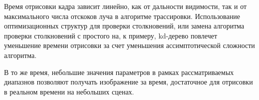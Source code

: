 Время отрисовки кадра зависит линейно, как от дальности видимости, так и от
максимального числа отскоков луча в алгоритме трассировки. Использование 
оптимизационных структур для проверки столкновений, или замена алгоритма 
проверки столкновений с простого на, к примеру, kd-дерево повлечет 
уменьшение времени отрисовки за счет уменьшения ассимптотической сложности 
алгоритма.

В то же время, небольшие значения параметров в рамках рассматриваемых диапазнов
позволяют получать изображение за время, достаточное для отрисовки в реальном времени на 
небольших сценах.



